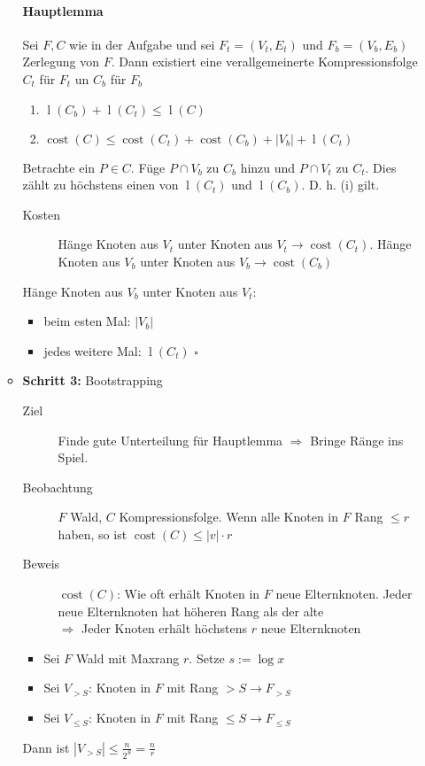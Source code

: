 \begin{itemize}
\begin{itemize}
         \paragraph*{Hauptlemma} Sei $F,C$ wie in der Aufgabe und sei $F_t = (V_t, E_t)$ und $F_b = (V_b, E_b)$ Zerlegung von $F$. Dann existiert eine verallgemeinerte Kompressionsfolge $C_t$ für $F_t$ un $C_b$ für $F_b$
         \begin{enumerate}
          \item $\operatorname{l}(C_b) + \operatorname{l}(C_t) \leq \operatorname{l}(C)$
          \item $\operatorname{cost}(C) \leq \operatorname{cost}(C_t) + \operatorname{cost}(C_b) + |V_b| + \operatorname{l}(C_t)$
         \end{enumerate}
         \Bew Betrachte ein $P \in C$. Füge $P \cap V_b$ zu $C_b$ hinzu und $P \cap V_t$ zu $C_t$. Dies zählt zu höchstens einen von $\operatorname{l}(C_t)$ und $\operatorname{l}(C_b)$. D. h. (i) gilt.
         \begin{description}
          \item[Kosten] Hänge Knoten aus $V_t$ unter Knoten aus $V_t \to \operatorname{cost}(C_t)$. Hänge Knoten aus $V_b$ unter Knoten aus $V_b \to \operatorname{cost}(C_b)$ 
         \end{description}
         Hänge Knoten aus $V_b$ unter Knoten aus $V_t$:
         \begin{itemize}
          \item beim esten Mal: $|V_b|$
          \item jedes weitere Mal: $\operatorname{l}(C_t)$ \hfill $\square$
         \end{itemize}
     \item \textbf{Schritt 3:} Bootstrapping
         \begin{description}
          \item[Ziel] Finde gute Unterteilung für Hauptlemma $\Rightarrow$ Bringe Ränge ins Spiel.
          \item[Beobachtung] $F$ Wald, $C$ Kompressionsfolge. Wenn alle Knoten in $F$ Rang $\leq r$ haben, so ist $\operatorname{cost}(C) \leq |v| \cdot r$
          \item[Beweis] $\operatorname{cost}(C)$: Wie oft erhält Knoten in $F$ neue Elternknoten. Jeder neue Elternknoten hat höheren Rang als der alte \\
         $\Rightarrow$ Jeder Knoten erhält höchstens $r$ neue Elternknoten
         \end{description}
         \begin{itemize}
         \item Sei $F$ Wald mit Maxrang $r$. Setze $s := \log x$
         \item Sei $V_{>S}$: Knoten in $F$ mit Rang $> S  \rightarrow F_{>S}$
         \item Sei $V_{\leq S}$: Knoten in $F$ mit Rang $\leq S  \rightarrow F_{\leq S}$ 
         \end{itemize}
         Dann ist $|V_{>S}| \leq \frac{n}{2^S} = \frac{n}{r}$

\end{itemize}
\end{itemize}
